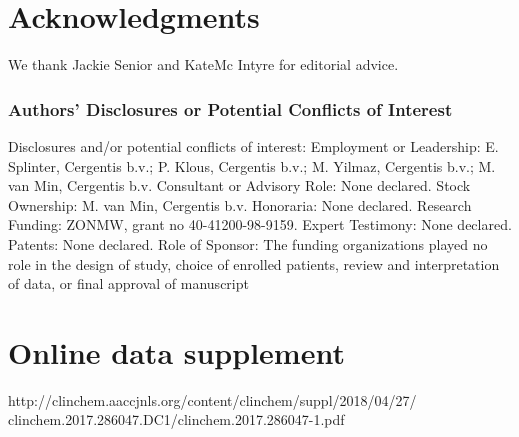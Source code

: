 \section{Acknowledgments}\label{Acknowledgments} 
We thank Jackie Senior and KateMc Intyre for editorial advice.


\subsubsection{Authors’ Disclosures or Potential Conflicts of Interest} 
Disclosures and/or potential conflicts of interest: Employment or Leadership: E. Splinter, Cergentis b.v.; P. Klous, Cergentis b.v.; M. Yilmaz, Cergentis b.v.; M. van Min, Cergentis b.v. 
Consultant or Advisory Role: None declared. 
Stock Ownership: M. van Min, Cergentis b.v. 
Honoraria: None declared. 
Research Funding: ZONMW, grant no 40-41200-98-9159. 
Expert Testimony: None declared. 
Patents: None declared.
Role of Sponsor: The funding organizations played no role in the design of study, choice of enrolled patients, review and interpretation of data, or final approval of manuscript

\section{Online data supplement}\label{Online data supplement}
http://clinchem.aaccjnls.org/content/clinchem/suppl/2018/04/27/\\clinchem.2017.286047.DC1/clinchem.2017.286047-1.pdf

